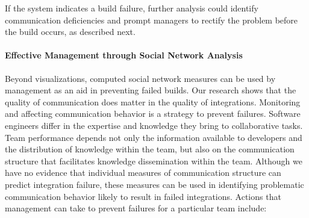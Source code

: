 If the system indicates a build failure, further analysis could
identify communication deficiencies and prompt managers to rectify the problem
before the build occurs, as described next.


\paragraph{Effective Management through Social Network Analysis}

Beyond visualizations, computed social network measures can be used
by
management as an aid in preventing failed builds. Our research shows that the quality of
communication does matter in the quality of integrations. Monitoring and
affecting communication behavior is a strategy to prevent failures. Software
engineers differ in the expertise and knowledge they bring to collaborative tasks. Team
performance depends not only the information available to developers and the
distribution of knowledge within the team, but also on the communication
structure that facilitates knowledge dissemination within the team. Although we
have no evidence that individual measures of communication structure can
predict integration failure, these measures can be used in identifying
problematic communication behavior likely to result in failed integrations.
Actions that management can take to prevent failures for a
particular team include:

